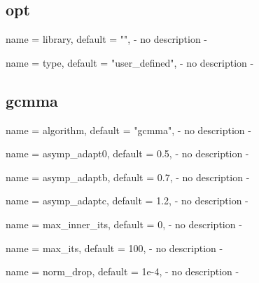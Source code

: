 \subsection{opt}

\begin{parameter}{
    name    = {library},
    default = {""},
}
- no description -
\end{parameter}

\begin{parameter}{
    name    = {type},
    default = {"user_defined"},
}
- no description -
\end{parameter}

\subsection{gcmma}

\begin{parameter}{
    name    = {algorithm},
    default = {"gcmma"},
}
- no description -
\end{parameter}

\begin{parameter}{
    name    = {asymp_adapt0},
    default = {0.5},
}
- no description -
\end{parameter}

\begin{parameter}{
    name    = {asymp_adaptb},
    default = {0.7},
}
- no description -
\end{parameter}

\begin{parameter}{
    name    = {asymp_adaptc},
    default = {1.2},
}
- no description -
\end{parameter}

\begin{parameter}{
    name    = {max_inner_its},
    default = {0},
}
- no description -
\end{parameter}

\begin{parameter}{
    name    = {max_its},
    default = {100},
}
- no description -
\end{parameter}

\begin{parameter}{
    name    = {norm_drop},
    default = {1e-4},
}
- no description -
\end{parameter}

